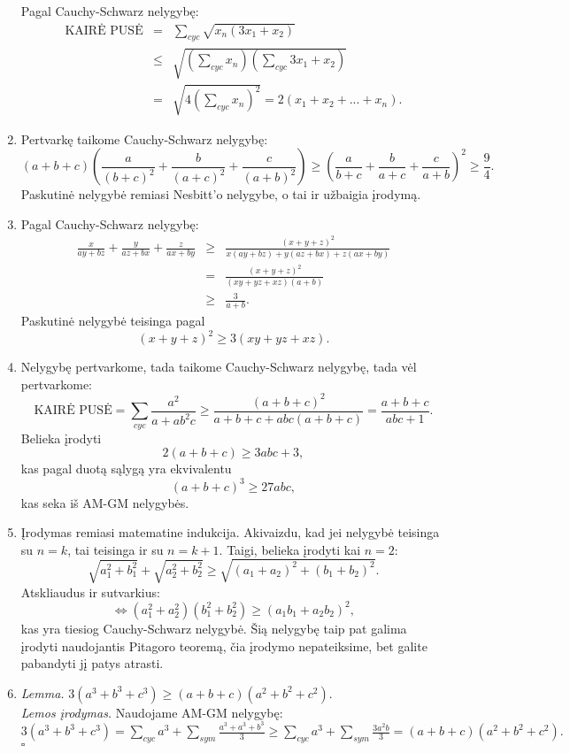 \begin{enumerate}
    Pagal Cauchy-Schwarz nelygybę: \begin{eqnarray*} \text{KAIRĖ PUSĖ}
    &=&\sum_{cyc}{\sqrt{x_n\left(3x_1+x_2\right)}}\\
    &\leq&\sqrt{\left(\sum_{cyc}{x_n}\right)\left(\sum_{cyc}{3x_1+x_2}\right)}\\
    &=&\sqrt{4\left(\sum_{cyc}{x_n}\right)^2}=2(x_1+x_2+...+x_n).\end{eqnarray*}
\item
    Pertvarkę taikome Cauchy-Schwarz nelygybę:
    $$(a+b+c)\left(\frac{a}{(b+c)^2}+\frac{b}{(a+c)^2}+\frac{c}{(a+b)^2}\right)\geq\left(\frac{a}{b+c}+\frac{b}{a+c}+\frac{c}{a+b}\right)^2\geq\frac{9}{4}.$$
    Paskutinė nelygybė remiasi Nesbitt'o nelygybe, o tai ir užbaigia
    įrodymą.
\item
    Pagal Cauchy-Schwarz nelygybę:
    \begin{eqnarray*}\frac{x}{ay+bz}+\frac{y}{az+bx}+\frac{z}{ax+by}&\geq&\frac{(x+y+z)^2}{x(ay+bz)+y(az+bx)+z(ax+by)}\\
    &=&\frac{(x+y+z)^2}{(xy+yz+xz)(a+b)}\\&\geq&\frac{3}{a+b}.\end{eqnarray*}
    Paskutinė nelygybė teisinga pagal $$(x+y+z)^2\geq3(xy+yz+xz).$$
\item
    Nelygybę pertvarkome, tada taikome Cauchy-Schwarz nelygybę, tada vėl
    pertvarkome: $$\text{KAIRĖ
    PUSĖ}=\sum_{cyc}{\frac{a^2}{a+ab^2c}}\geq\frac{(a+b+c)^2}{a+b+c+abc(a+b+c)}=\frac{a+b+c}{abc+1}.$$
    Belieka įrodyti $$2(a+b+c)\geq3abc+3,$$ kas pagal duotą sąlygą yra
    ekvivalentu $$(a+b+c)^3\geq27abc,$$ kas seka iš AM-GM nelygybės.
\item
    Įrodymas remiasi matematine indukcija. Akivaizdu, kad jei nelygybė
    teisinga su $n=k$, tai teisinga ir su $n=k+1$. Taigi, belieka įrodyti
    kai $n=2$:
    $$\sqrt{a_1^2+b_1^2}+\sqrt{a_2^2+b_2^2}\geq\sqrt{(a_1+a_2)^2+(b_1+b_2)^2}.$$
    Atskliaudus ir sutvarkius:
    $$\Leftrightarrow(a_1^2+a_2^2)(b_1^2+b_2^2)\geq(a_1b_1+a_2b_2)^2,$$
    kas yra tiesiog Cauchy-Schwarz nelygybė.
    Šią nelygybę taip pat galima įrodyti naudojantis Pitagoro teoremą, čia
    įrodymo nepateiksime, bet galite pabandyti jį patys atrasti.
\item
    \textit{Lemma.} $3(a^3+b^3+c^3)\geq(a+b+c)(a^2+b^2+c^2)$.\\
    \noindent\textit{Lemos įrodymas.} Naudojame AM-GM nelygybę:
    $3(a^3+b^3+c^3)=\sum\limits_{cyc}{a^3}+\sum\limits_{sym}{\frac{a^3+a^3+b^3}{3}}\geq\sum\limits_{cyc}{a^3}+\sum\limits_{sym}{\frac{3a^2b}{3}}=(a+b+c)(a^2+b^2+c^2).$\hfill{$\square$}

\end{enumerate}
